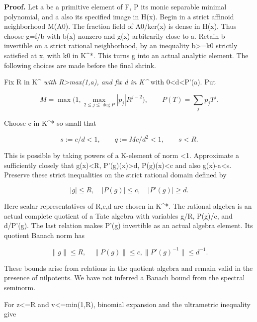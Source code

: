 \documentclass[
  10pt,
]{article}
\begin{document}
\textbf{Proof.} Let a be a primitive element of F, P its monic separable
minimal polynomial, and a also its specified image in H(x). Begin in a
strict affinoid neighborhood M(A0). The fraction field of A0/ker(x) is
dense in H(x). Thus choose g=f/b with b(x) nonzero and g(x) arbitrarily
close to a. Retain b invertible on a strict rational neighborhood, by an
inequality \textbar b\textbar\textgreater=\textbar k0\textbar{} strictly
satisfied at x, with k0 in K\^{}*. This turns g into an actual analytic
element. The following choices are made before the final shrink.

Fix R in \textbar K\^{}\emph{\textbar{} with
R\textgreater max(1,\textbar a\textbar), and fix d in
\textbar K\^{}}\textbar{} with
0\textless d\textless\textbar P'(a)\textbar. Put

\[
 M=\max\bigl(1,\max_{2\leq j\leq\deg P}
                     |p_j|R^{j-2}\bigr),
 \qquad P(T)=\sum_jp_jT^j.                                 \tag{9}
\]

Choose c in \textbar K\^{}*\textbar{} so small that

\[
 s:=c/d<1,\qquad q:=Mc/d^2<1,\qquad s< R.                   \tag{10}
\]

This is possible by taking powers of a K-element of norm \textless1.
Approximate a sufficiently closely that
\textbar g(x)\textbar\textless R,
\textbar P'(g)(x)\textbar\textgreater d,
\textbar P(g)(x)\textbar\textless c and also
\textbar g(x)-a\textbar\textless s. Preserve these strict inequalities
on the strict rational domain defined by

\[
 |g|\leq R,\quad |P(g)|\leq c,\quad |P'(g)|\geq d.            \tag{11}
\]

Here scalar representatives of R,c,d are chosen in K\^{}*. The rational
algebra is an actual complete quotient of a Tate algebra with variables
g/R, P(g)/c, and d/P'(g). The last relation makes P'(g) invertible as an
actual algebra element. Its quotient Banach norm has

\[
 \|g\|\leq R,\quad\|P(g)\|\leq c,
              \|P'(g)^{-1}\|\leq d^{-1}.                    \tag{12}
\]

These bounds arise from relations in the quotient algebra and remain
valid in the presence of nilpotents. We have not inferred a Banach bound
from the spectral seminorm.

For \textbar\textbar z\textbar\textbar\textless=R and
\textbar\textbar v\textbar\textbar\textless=min(1,R), binomial expansion
and the ultrametric inequality give
\end{document}
